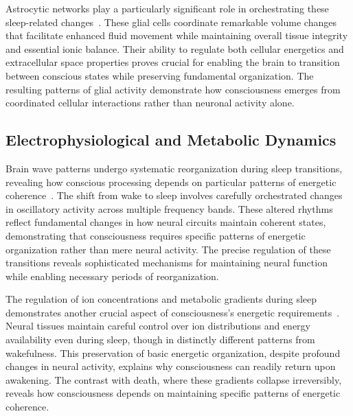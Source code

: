 Astrocytic networks play a particularly significant role in orchestrating these sleep-related changes~\cite{pinotsis2023cytoelectric}. These glial cells coordinate remarkable volume changes that facilitate enhanced fluid movement while maintaining overall tissue integrity and essential ionic balance. Their ability to regulate both cellular energetics and extracellular space properties proves crucial for enabling the brain to transition between conscious states while preserving fundamental organization. The resulting patterns of glial activity demonstrate how consciousness emerges from coordinated cellular interactions rather than neuronal activity alone.

\subsection*{Electrophysiological and Metabolic Dynamics}

Brain wave patterns undergo systematic reorganization during sleep transitions, revealing how conscious processing depends on particular patterns of energetic coherence~\cite{van2025processes}. The shift from wake to sleep involves carefully orchestrated changes in oscillatory activity across multiple frequency bands. These altered rhythms reflect fundamental changes in how neural circuits maintain coherent states, demonstrating that consciousness requires specific patterns of energetic organization rather than mere neural activity. The precise regulation of these transitions reveals sophisticated mechanisms for maintaining neural function while enabling necessary periods of reorganization.

The regulation of ion concentrations and metabolic gradients during sleep demonstrates another crucial aspect of consciousness's energetic requirements~\cite{pinotsis2023cytoelectric}. Neural tissues maintain careful control over ion distributions and energy availability even during sleep, though in distinctly different patterns from wakefulness. This preservation of basic energetic organization, despite profound changes in neural activity, explains why consciousness can readily return upon awakening. The contrast with death, where these gradients collapse irreversibly, reveals how consciousness depends on maintaining specific patterns of energetic coherence.

